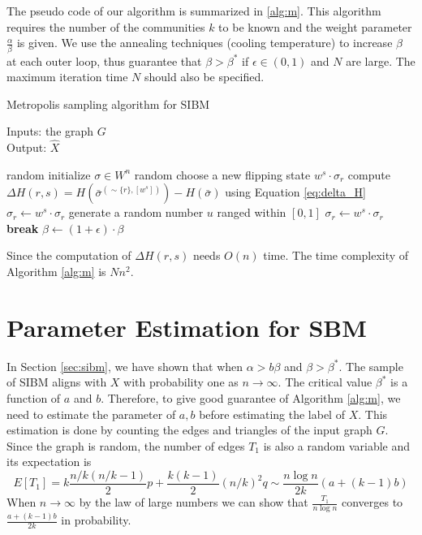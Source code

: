 \documentclass{ctexart}
\begin{document}
	The pseudo code of our algorithm is summarized in \ref{alg:m}. This algorithm requires the number of the communities $k$ to be known and the weight parameter $\frac{\alpha}{\beta}$ is given. We use the annealing techniques (cooling temperature) to increase $\beta$ at each outer loop, thus guarantee that $\beta > \beta^*$
	if $\epsilon \in (0, 1)$ and $N$ are large. 
	The maximum iteration time $N$ should also be specified.
	\begin{algorithm}[H]
		\caption{Metropolis sampling algorithm for SIBM} \label{alg:m}
		Inputs: the graph $G$ \\
		Output: $\hat{X}$
		\begin{algorithmic}[1]
			\STATE random initialize $\sigma \in W^n$
			\STATE random choose a new flipping state $w^s \cdot \sigma_r$
			\STATE compute $\Delta H(r,s) = H(\bar{\sigma}^{(\sim \{r\}, [w^s])}) - H(\bar{\sigma})$ using Equation \eqref{eq:delta_H}
			\STATE $\sigma_r \leftarrow w^s \cdot \sigma_r$
			\ELSE
			\STATE generate a random number $u$ ranged within $[0,1]$
			\STATE $\sigma_r \leftarrow w^s \cdot \sigma_r$
			\ENDIF
			\ENDIF
			\ENDFOR
			\STATE \textbf{break}
			\ENDIF
			\STATE $\beta \leftarrow (1 + \epsilon)\cdot\beta$
			\ENDWHILE
		\end{algorithmic}
	\end{algorithm}
	Since the computation of $\Delta H(r,s)$ needs $O(n)$ time. The time complexity of Algorithm \ref{alg:m} is $Nn^2$.
	\section{Parameter Estimation for SBM}
	In Section \ref{sec:sibm}, we have shown that when $\alpha > b \beta$ and $\beta > \beta^*$. The sample of SIBM aligns with $X$ with probability one
	as $n\to \infty$. 
	The critical value $\beta^*$ is a function of $a$ and $b$. Therefore, to give good guarantee of Algorithm \ref{alg:m}, we need to estimate the parameter
	of $a,b$ before estimating the label of $X$.
	This estimation is done by counting the edges and triangles of the input graph $G$.
	Since the graph is random, the number of edges $T_1$ is also a random variable and its expectation is
	\begin{equation}
	E[T_1] = k \frac{n/k(n/k-1)}{2} p + \frac{k(k-1)}{2} (n/k)^2 q \sim \frac{n\log n}{2k} (a + (k-1) b)
	\end{equation}
	When $n \to \infty$ by the law of large numbers we can show that $\frac{T_1}{n \log n}$ converges to $\frac{a+(k-1)b}{2k}$ in probability.
	
\end{document}
